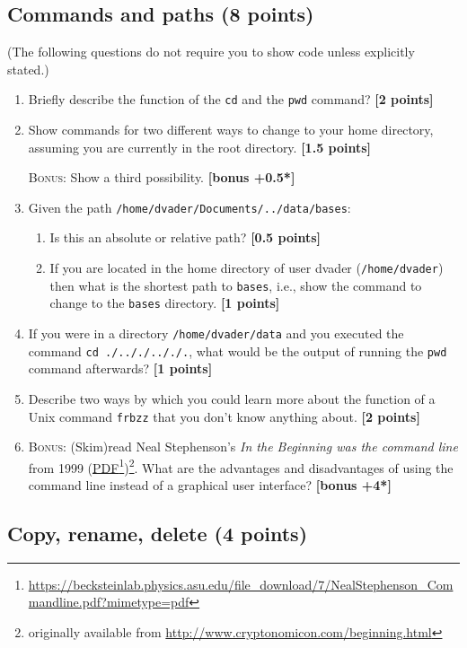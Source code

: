 \documentclass[letterpaper]{scrartcl}
\newcommand{\BONUS}{\textsc{Bonus: }}
\newcommand{\bonus}[1]{\textbf{[bonus +#1*]}}
\newcommand{\points}[1]{\textbf{[#1 points]}}
\newenvironment{enuma}{\begin{enumerate}[label=(\alph*)]}{\end{enumerate}}
\newenvironment{enumi}{\begin{enumerate}[label=(\roman*)]}{\end{enumerate}}
\newcommand{\fnhref}[2]{\href{#1}{#2}\footnote{\url{#1}}}
\begin{document}
\subsection{Commands and paths (8 points)}
(The following questions do not require you to show code unless
explicitly stated.)
\begin{enuma}
\item Briefly describe the function of the \texttt{cd} and the
  \texttt{pwd} command? \points{2}
\item Show commands for two different ways to change to your home directory,
  assuming you are currently in the root directory. \points{1.5}

  \BONUS Show a third possibility. \bonus{0.5}
\item Given the path \texttt{/home/dvader/Documents/../data/bases}:
  \begin{enumi}
    \item Is this an absolute or relative path? \points{0.5}
    \item If you are located in the home directory of user dvader
      (\texttt{/home/dvader}) then what is the shortest path to
      \texttt{bases}, i.e., show the command to change to the
      \texttt{bases} directory. \points{1}
  \end{enumi}
\item If you were in a directory \texttt{/home/dvader/data} and you
  executed the command \texttt{cd ./.././.././.}, what would be the
  output of running the \texttt{pwd} command afterwards? \points{1}
\item Describe two ways by which you could learn more about the
  function of a Unix command \texttt{frbzz} that you don't know
  anything about. \points{2}
\item \BONUS (Skim)read Neal Stephenson's \emph{In the Beginning was
  the command line} from 1999
  (\fnhref{https://becksteinlab.physics.asu.edu/file_download/7/NealStephenson_Commandline.pdf?mimetype=pdf}{PDF})\footnote{originally
  available from
  \url{http://www.cryptonomicon.com/beginning.html}}. What are the
  advantages and disadvantages of using the command line instead of a
  graphical user interface? \bonus{4}
\end{enuma}

\subsection{Copy, rename, delete (4 points)}
\end{document}

